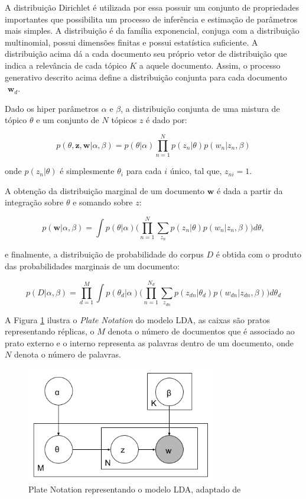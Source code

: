 \documentclass[12pt,a4paper]{article}
\begin{document}
  A distribuição Dirichlet é utilizada por essa possuir um conjunto de propriedades importantes que possibilita um processo de inferência e estimação de parâmetros mais simples.
   A distribuição é da família exponencial, conjuga com a distribuição multinomial, possui dimensões finitas e possui estatística suficiente.
   A distribuição  acima dá a cada documento seu próprio vetor de distribuição que indica a relevância de cada tópico $K$ a aquele documento.
   Assim, o processo generativo descrito acima define a distribuição conjunta para cada documento $\textbf{ w}_d$.
  
  Dado os hiper parâmetros $\alpha$ e $\beta$, a distribuição conjunta de uma mistura de tópico $\theta$ e um conjunto de $N$ tópicos $z$ é dado por:
  
  \begin{equation}
  p(\theta,\textbf{z},\textbf{w}|\alpha,\beta) = p(\theta|\alpha) \prod_{n=1}^{N} p(z_n|\theta)p(w_n|z_n,\beta)
  \end{equation}
  
  onde $p(z_n | \theta)$ é simplesmente $\theta _i$ para cada $i$ único,
   tal que, $z_{ni}=1$.
   
  A obtenção da distribuição marginal de um documento $\textbf{w}$ é dada a partir da integração sobre $\theta$ e somando sobre $z$:
  
  \begin{equation}
  p(\textbf{w}|\alpha,\beta)=\int{p(\theta|\alpha)\Bigg(\prod_{n=1}^{N}\sum_{z_n} p(z_n|\theta)p(w_n|z_n,\beta)\Bigg)d\theta},
  \end{equation}
  
  e finalmente, a distribuição de probabilidade do corpus $D$ é obtida com o produto das probabilidades marginais de um documento:
  
  \begin{equation}
  p(D|\alpha,\beta)= \prod_{d=1}^{M} \int{p(\theta _d|\alpha)\Bigg(\prod_{n=1}^{N_d}\sum_{z_{dn}} p(z_{dn}|\theta _d)p(w_{dn}|z_{dn},\beta)\Bigg)d\theta _d}
  \end{equation}
  
  
  A Figura \ref{fig-plate} ilustra o 	\textit{Plate Notation} do modelo LDA, as caixas são pratos representando réplicas,
  o $M$ denota o número de documentos que é associado ao prato externo e o interno representa as palavras dentro de um documento, onde $N$ denota o número de palavras.
  
  \begin{figure}[H]
   \centering
     \includegraphics[height=5cm]{images/figure_1.png}
     \caption{Plate Notation representando o modelo LDA, adaptado de }
     \label{fig-plate}
  \end{figure}
  
\end{document}
